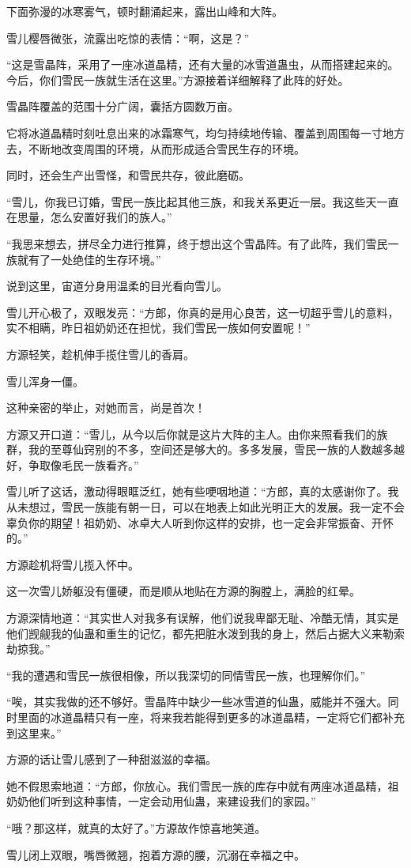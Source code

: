 \begin{this_body}
下面弥漫的冰寒雾气，顿时翻涌起来，露出山峰和大阵。

雪儿樱唇微张，流露出吃惊的表情：“啊，这是？”

“这是雪晶阵，采用了一座冰道晶精，还有大量的冰雪道蛊虫，从而搭建起来的。今后，你们雪民一族就生活在这里。”方源接着详细解释了此阵的好处。

雪晶阵覆盖的范围十分广阔，囊括方圆数万亩。

它将冰道晶精时刻吐息出来的冰霜寒气，均匀持续地传输、覆盖到周围每一寸地方去，不断地改变周围的环境，从而形成适合雪民生存的环境。

同时，还会生产出雪怪，和雪民共存，彼此磨砺。

“雪儿，你我已订婚，雪民一族比起其他三族，和我关系更近一层。我这些天一直在思量，怎么安置好我们的族人。”

“我思来想去，拼尽全力进行推算，终于想出这个雪晶阵。有了此阵，我们雪民一族就有了一处绝佳的生存环境。”

说到这里，宙道分身用温柔的目光看向雪儿。

雪儿开心极了，双眼发亮：“方郎，你真的是用心良苦，这一切超乎雪儿的意料，实不相瞒，昨日祖奶奶还在担忧，我们雪民一族如何安置呢！”

方源轻笑，趁机伸手揽住雪儿的香肩。

雪儿浑身一僵。

这种亲密的举止，对她而言，尚是首次！

方源又开口道：“雪儿，从今以后你就是这片大阵的主人。由你来照看我们的族群，我的至尊仙窍别的不多，空间还是够大的。多多发展，雪民一族的人数越多越好，争取像毛民一族看齐。”

雪儿听了这话，激动得眼眶泛红，她有些哽咽地道：“方郎，真的太感谢你了。我从未想过，雪民一族能有朝一日，可以在地表上如此光明正大的发展。我一定不会辜负你的期望！祖奶奶、冰卓大人听到你这样的安排，也一定会非常振奋、开怀的。”

方源趁机将雪儿揽入怀中。

这一次雪儿娇躯没有僵硬，而是顺从地贴在方源的胸膛上，满脸的红晕。

方源深情地道：“其实世人对我多有误解，他们说我卑鄙无耻、冷酷无情，其实是他们觊觎我的仙蛊和重生的记忆，都先把脏水泼到我的身上，然后占据大义来勒索劫掠我。”

“我的遭遇和雪民一族很相像，所以我深切的同情雪民一族，也理解你们。”

“唉，其实我做的还不够好。雪晶阵中缺少一些冰雪道的仙蛊，威能并不强大。同时里面的冰道晶精只有一座，将来我若能得到更多的冰道晶精，一定将它们都补充到这里来。”

方源的话让雪儿感到了一种甜滋滋的幸福。

她不假思索地道：“方郎，你放心。我们雪民一族的库存中就有两座冰道晶精，祖奶奶他们听到这种事情，一定会动用仙蛊，来建设我们的家园。”

“哦？那这样，就真的太好了。”方源故作惊喜地笑道。

雪儿闭上双眼，嘴唇微翘，抱着方源的腰，沉溺在幸福之中。

\end{this_body}

